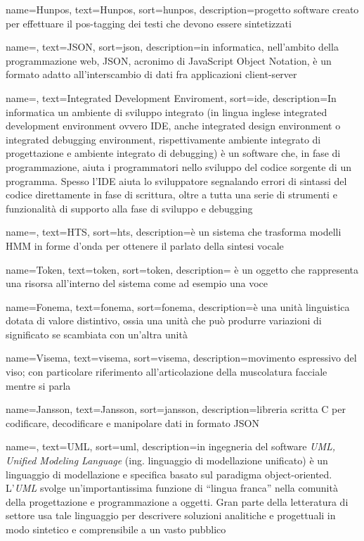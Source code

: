 {
	name=Hunpos,
	text=Hunpos,
	sort=hunpos,
	description={progetto software creato per effettuare il pos-tagging dei testi che devono essere sintetizzati}
}

{
	name=,
	text=JSON,
	sort=json,
	description={in informatica, nell'ambito della programmazione web, JSON, acronimo di JavaScript Object Notation, è un formato adatto all'interscambio di dati fra applicazioni client-server}
}

{
	name=,
	text=Integrated Development Enviroment,
	sort=ide,
	description={In informatica un ambiente di sviluppo integrato (in lingua inglese integrated development environment ovvero IDE, anche integrated design environment o integrated debugging environment, rispettivamente ambiente integrato di progettazione e ambiente integrato di debugging) è un software che, in fase di programmazione, aiuta i programmatori nello sviluppo del codice sorgente di un programma. Spesso l'IDE aiuta lo sviluppatore segnalando errori di sintassi del codice direttamente in fase di scrittura, oltre a tutta una serie di strumenti e funzionalità di supporto alla fase di sviluppo e debugging}
}

{
	name=,
	text=HTS,
	sort=hts,
	description={è un sistema che trasforma modelli HMM in forme d'onda per ottenere il parlato della sintesi vocale}
}

{
	name=Token,
	text=token,
	sort=token,
	description={ è un oggetto che rappresenta una risorsa all'interno del sistema come ad esempio una voce}
}

{
	name=Fonema,
	text=fonema,
	sort=fonema,
	description={è una unità linguistica dotata di valore distintivo, ossia una unità che può produrre variazioni di significato se scambiata con un'altra unità}
}

{
	name=Visema,
	text=visema,
	sort=visema,
	description={movimento espressivo del viso; con particolare riferimento all'articolazione della muscolatura facciale mentre si parla}
}

{
	name=Jansson,
	text=Jansson,
	sort=jansson,
	description={libreria scritta C per codificare, decodificare e manipolare dati in formato JSON}
}

{
    name=,
    text=UML,
    sort=uml,
    description={in ingegneria del software \emph{UML, Unified Modeling Language} (ing. linguaggio di modellazione unificato) è un linguaggio di modellazione e specifica basato sul paradigma object-oriented. L'\emph{UML} svolge un'importantissima funzione di ``lingua franca'' nella comunità della progettazione e programmazione a oggetti. Gran parte della letteratura di settore usa tale linguaggio per descrivere soluzioni analitiche e progettuali in modo sintetico e comprensibile a un vasto pubblico}
}

